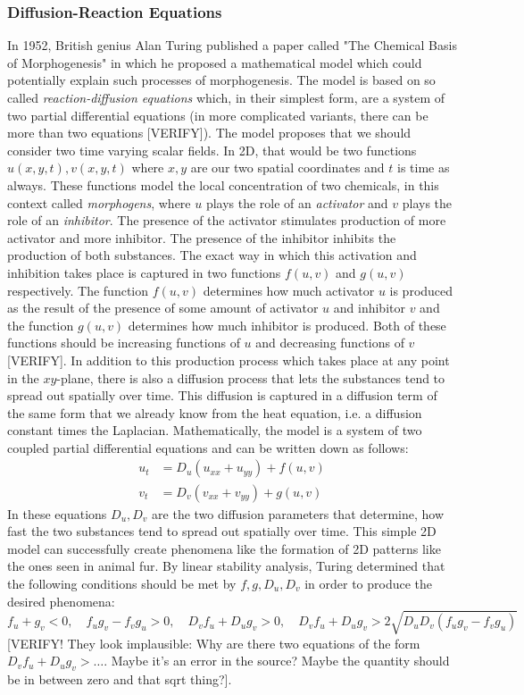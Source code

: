 \subsubsection{Diffusion-Reaction Equations} In 1952, British genius Alan Turing published a paper called "The Chemical Basis of Morphogenesis" in which he proposed a mathematical model which could potentially explain such processes of morphogenesis. The model is based on so called \emph{reaction-diffusion equations} which, in their simplest form, are a system of two partial differential equations (in more complicated variants, there can be more than two equations [VERIFY]). The model proposes that we should consider two time varying scalar fields. In 2D, that would be two functions $u(x,y,t), v(x,y,t)$ where $x,y$ are our two spatial coordinates and $t$ is time as always. These functions model the local concentration of two chemicals, in this context called \emph{morphogens}, where $u$ plays the role of an \emph{activator} and $v$ plays the role of an \emph{inhibitor}. The presence of the activator stimulates production of more activator and more inhibitor. The presence of the inhibitor inhibits the production of both substances. The exact way in which this activation and inhibition takes place is captured in two functions $f(u,v)$ and $g(u,v)$ respectively. The function $f(u,v)$ determines how much activator $u$ is produced as the result of the presence of some amount of activator $u$ and inhibitor $v$ and the function $g(u,v)$ determines how much inhibitor is produced. Both of these functions should be increasing functions of $u$ and decreasing functions of $v$ [VERIFY]. In addition to this production process which takes place at any point in the $xy$-plane, there is also a diffusion process that lets the substances tend to spread out spatially over time. This diffusion is captured in a diffusion term of the same form that we already know from the heat equation, i.e. a diffusion constant times the Laplacian. Mathematically, the model is a system of two coupled partial differential equations and can be written down as follows:
\begin{eqnarray}
u_t &= D_u (u_{xx} + u_{yy}) + f(u,v)  \\
v_t &= D_v (v_{xx} + v_{yy}) + g(u,v) 
\end{eqnarray}
In these equations $D_u, D_v$ are the two diffusion parameters that determine, how fast the two substances tend to spread out spatially over time. This simple 2D model can successfully create phenomena like the formation of 2D patterns like the ones seen in animal fur. By linear stability analysis, Turing determined that the following conditions should be met by $f, g, D_u, D_v$ in order to produce the desired phenomena:
\begin{equation}
 f_u + g_v < 0, \quad 
 f_u g_v - f_v g_u > 0, \quad
 D_v f_u + D_u g_v > 0, \quad
 D_v f_u + D_u g_v > 2 \sqrt{D_u D_v (f_u g_v - f_v g_u)}
\end{equation}
[VERIFY! They look implausible: Why are there two equations of the form $D_v f_u + D_u g_v > \ldots$. Maybe it's an error in the source? Maybe the quantity should be in between zero and that sqrt thing?].

